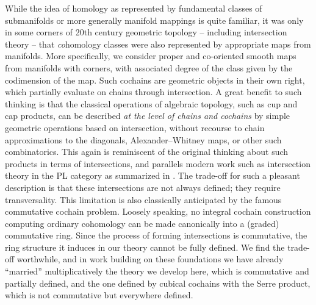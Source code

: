 While the idea of homology as represented by fundamental classes of submanifolds or more generally manifold mappings is quite familiar, it was only in some corners of 20th century geometric topology -- including intersection theory -- that \textit{co}homology classes were also represented by appropriate maps from manifolds.
More specifically, we consider proper and co-oriented smooth maps from manifolds with corners, with associated degree of the class given by the codimension of the map.
Such cochains are geometric objects in their own right, which partially evaluate on chains through intersection.
A great benefit to such thinking is that the classical operations of algebraic topology, such as cup and cap products, can be described \textit{at the level of chains and cochains} by simple geometric operations based on intersection, without recourse to chain approximations to the diagonals, Alexander--Whitney maps, or other such combinatorics.
This again is reminiscent of the original thinking about such products in terms of intersections, and parallels modern work such as intersection theory in the PL category as summarized in \cite{McC06}.
The trade-off for such a pleasant description is that these intersections are not always defined; they require transversality.
This limitation is also classically anticipated by the famous commutative cochain problem.
Loosely speaking, no integral cochain construction computing ordinary cohomology can be made canonically into a (graded) commutative ring.
Since the process of forming intersections is commutative, the ring structure it induces in our theory cannot be fully defined.
We find the trade-off worthwhile, and in work building on these foundations \cite{FMS-flows} we have already ``married'' multiplicatively the theory we develop here, which is commutative and partially defined, and the one defined by cubical cochains with the Serre product, which is not commutative but everywhere defined.

